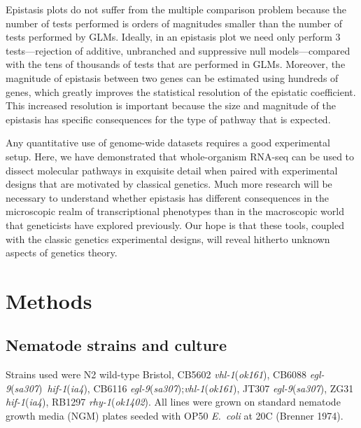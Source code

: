 \documentclass[10pt, onecolumn]{article}
\newcommand{\ecol}{\emph{E.~coli}}
\newcommand{\gene}[1]{\emph{#1}}
\begin{document}
Epistasis plots do not suffer from the multiple comparison problem because the
number of tests performed is orders of magnitudes smaller than the number
of tests performed by GLMs. Ideally, in an epistasis plot we need only perform
3 tests---rejection of additive, unbranched and suppressive null models---compared
with the tens of thousands of tests that are performed in GLMs. Moreover, the
magnitude of epistasis between two genes can be estimated using hundreds of genes,
which greatly improves the statistical resolution of the epistatic coefficient.
This increased resolution is important because the size and magnitude of the
epistasis has specific consequences for the type of pathway that is expected.

Any quantitative use of genome-wide datasets requires a good experimental setup.
Here, we have demonstrated that whole-organism RNA-seq can be used to dissect
molecular pathways in exquisite detail when paired with experimental designs that
are motivated by classical genetics. Much more research will be necessary
to understand whether epistasis has different consequences in the microscopic
realm of transcriptional phenotypes than in the macroscopic world that geneticists
have explored previously. Our hope is that these tools, coupled with the classic
genetics experimental  designs, will reveal hitherto unknown aspects of genetics
theory.

\section*{Methods}
\label{sec:methods}
\subsection*{Nematode strains and culture}
Strains used were N2 wild-type Bristol,
CB5602 \gene{vhl-1}(\emph{ok161}),
CB6088 \gene{egl-9}(\emph{sa307})~\gene{hif-1}(\emph{ia4}),
CB6116 \gene{egl-9}(\emph{sa307});\gene{vhl-1}(\emph{ok161}),
JT307 \gene{egl-9}(\emph{sa307}),
ZG31 \gene{hif-1}(\emph{ia4}),
RB1297 \gene{rhy-1}(\emph{ok1402}).
All lines were grown on standard
nematode growth media (NGM) plates seeded with OP50 \ecol{} at 20\degree{}C
(Brenner 1974).
\end{document}
